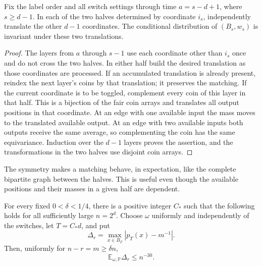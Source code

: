 \begin{lemma}
\label{lem:c-palette-half-translations}
Fix the label order and all switch settings through time
$a=s-d+1$, where $s\ge d-1$.  In each of the two halves determined by
coordinate $i_s$, independently translate the other $d-1$ coordinates.
The conditional distribution of $(B_s,w_s)$ is invariant under these two
translations.
\end{lemma}

\begin{proof}
The layers from $a$ through $s-1$ use each coordinate other than $i_s$
once and do not cross the two halves.  In either half build the desired
translation as those coordinates are processed.  If an accumulated
translation is already present, reindex the next layer's coins by that
translation; it preserves the matching.  If the current coordinate is
to be toggled, complement every coin of this layer in that half.  This
is a bijection of the fair coin arrays and translates all output
positions in that coordinate.  At an edge with one available input the
mass moves to the translated available output.  At an edge with two
available inputs both outputs receive the same average, so complementing the coin has the
same equivariance.  Induction over the $d-1$ layers proves the assertion,
and the transformations in the two halves use disjoint coin arrays.
\end{proof}

The symmetry makes a matching behave, in expectation, like the complete
bipartite graph between the halves.  This is useful even though the
available positions and their masses in a given half are dependent.

\begin{proposition}
\label{prop:c-palette-discrepancy}
For every fixed $0<\delta<1/4$, there is a positive integer $C_*$ such
that the following holds for all sufficiently large $n=2^d$.  Choose
$\omega$ uniformly and independently of the switches, let $T=C_*d$, and
put
\[
 \Delta_r=\max_{x\in B_T}|p_T(x)-m^{-1}|.
\]
Then, uniformly for $n-r=m\ge\delta n$,
\begin{equation}
 \mathbb E_{\omega,\mathbb P}\Delta_r\le n^{-30}.
 \label{eq:c-palette-discrepancy}
\end{equation}
\end{proposition}

